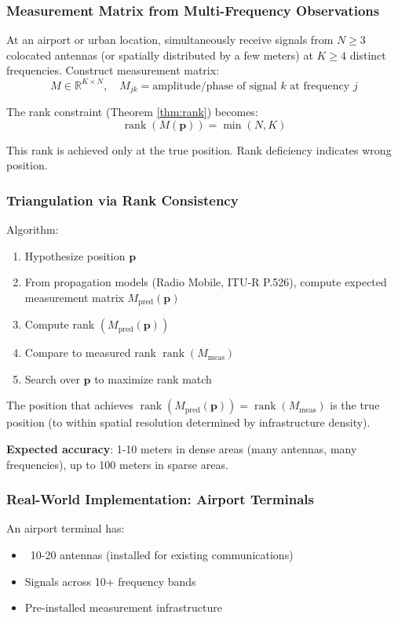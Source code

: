 \documentclass[11pt,twocolumn,a4paper]{article}
\theoremstyle{definition}
\DeclareMathOperator{\rank}{rank}
\begin{document}
\subsubsection{Measurement Matrix from Multi-Frequency Observations}

At an airport or urban location, simultaneously receive signals from $N \geq 3$ colocated antennas (or spatially distributed by a few meters) at $K \geq 4$ distinct frequencies. Construct measurement matrix:
\[
M \in \mathbb{R}^{K \times N}, \quad M_{jk} = \text{amplitude/phase of signal } k \text{ at frequency } j
\]

The rank constraint (Theorem \ref{thm:rank}) becomes:
\[
\rank(M(\mathbf{p})) = \min(N, K)
\]

This rank is achieved only at the true position. Rank deficiency indicates wrong position.

\subsubsection{Triangulation via Rank Consistency}

Algorithm:
\begin{enumerate}[nosep]
\item Hypothesize position $\mathbf{p}$
\item From propagation models (Radio Mobile, ITU-R P.526), compute expected measurement matrix $M_{\text{pred}}(\mathbf{p})$
\item Compute rank $(M_{\text{pred}}(\mathbf{p}))$
\item Compare to measured rank $\rank(M_{\text{meas}})$
\item Search over $\mathbf{p}$ to maximize rank match
\end{enumerate}

The position that achieves $\rank(M_{\text{pred}}(\mathbf{p})) = \rank(M_{\text{meas}})$ is the true position (to within spatial resolution determined by infrastructure density).

\textbf{Expected accuracy}: 1-10 meters in dense areas (many antennas, many frequencies), up to 100 meters in sparse areas.

\subsubsection{Real-World Implementation: Airport Terminals}

An airport terminal has:
\begin{itemize}[nosep]
\item ~10-20 antennas (installed for existing communications)
\item Signals across 10+ frequency bands
\item Pre-installed measurement infrastructure
\end{itemize}
\end{document}
